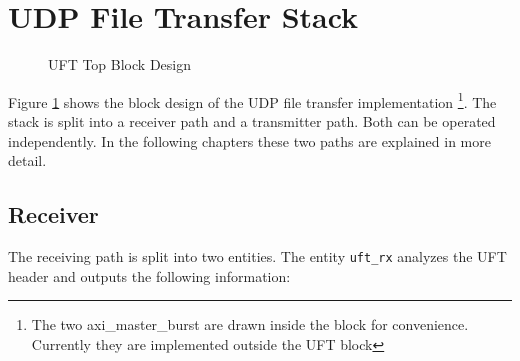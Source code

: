%
%

%
%
\section{UDP File Transfer Stack}

\begin{figure}[tb!]
    \centering
    \begin{adjustbox}{max width=\textwidth}
        
    \end{adjustbox}
    \caption{UFT Top Block Design}
    \label{fig:ufttop}
\end{figure}

Figure \ref{fig:ufttop} shows the block design of the UDP file transfer
implementation \footnote{The two axi\_master\_burst are drawn inside the block
for convenience. Currently they are implemented outside the UFT block}. The
stack is split into a receiver path and a transmitter path. Both can be operated
independently. In the following chapters these two paths are explained in more
detail.

%
%
\subsection{Receiver} \label{chapt:uftreceiver}
The receiving path is split into two entities. The entity \texttt{uft\_rx}
analyzes the UFT header and outputs the following information:

